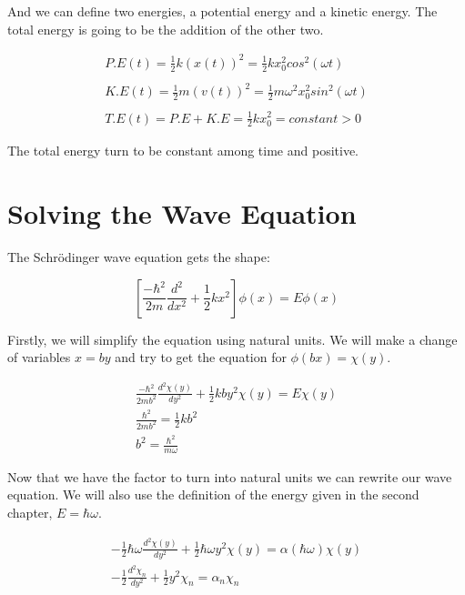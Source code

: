 And we can define two energies, a potential energy and a kinetic energy. The total energy is going to be the addition of the other two.

\begin{equation}
  \begin{array}{c}
    P.E(t) = \frac{1}{2} k (x(t))^2 = \frac{1}{2} k x_0^2 cos^2(\omega t)
    \\

    \\
    K.E(t) = \frac{1}{2} m (v(t))^2 = \frac{1}{2} m \omega^2 x_0^2 sin^2(\omega t)
    \\

    \\
    T.E(t) = P.E + K.E = \frac{1}{2} k x_0^2 = constant > 0
  \end{array}
\end{equation}

The total energy turn to be constant among time and positive.

\section{Solving the Wave Equation}

The Schrödinger wave equation gets the shape:

\begin{equation}
  \left[\frac{-\hbar^2}{2m}\frac{d^2}{dx^2}+\frac{1}{2}kx^2\right]\phi(x) = E \phi(x)
\end{equation}

Firstly, we will simplify the equation using natural units. We will make a change of variables $x=by$ and try to get the equation for $\phi(bx)=\chi(y)$.

\begin{equation}
  \begin{array}{c}
    \frac{-\hbar^2}{2mb^2}\frac{d^2\chi(y)}{dy^2}+\frac{1}{2}kby^2\chi(y) = E\chi(y)
    \\
    \frac{\hbar^2}{2mb^2} = \frac{1}{2}k b^2
    \\
    b^2 = \frac{\hbar^2}{m\omega}
  \end{array}
\end{equation}

Now that we have the factor to turn into natural units we can rewrite our wave equation. We will also use the definition of the energy given in the second chapter, $E=\hbar \omega$.

\begin{equation}
  \begin{array}{c}
    -\frac{1}{2}\hbar \omega \frac{d^2\chi(y)}{dy^2} + \frac{1}{2} \hbar \omega y^2 \chi(y) = \alpha(\hbar\omega)\chi(y)
    \\
    -\frac{1}{2}\frac{d^2\chi_n}{dy^2}+\frac{1}{2}y^2\chi_n = \alpha_n \chi_n
  \end{array}
\end{equation}

